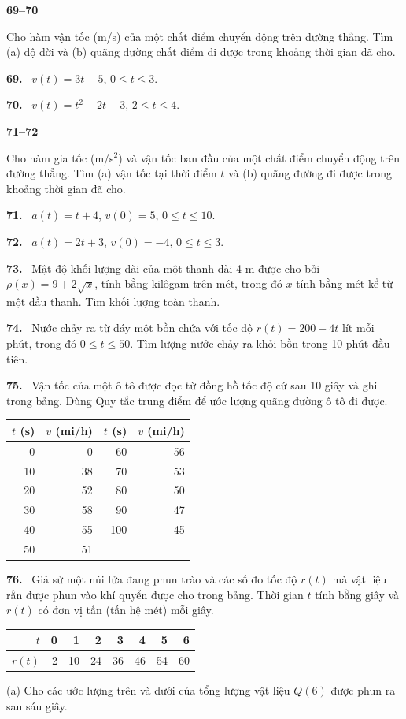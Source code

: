 \documentclass[12pt,a4paper]{article}
\newcommand{\bt}[1]{\par\smallskip\Needspace{5\baselineskip}\noindent\textbf{#1.}\ }
\newcommand{\group}[1]{\par\medskip\noindent\textbf{#1}\par\nopagebreak[4]}
\begin{document}
\group{69–70} Cho hàm vận tốc (m/s) của một chất điểm chuyển động trên đường thẳng. Tìm (a) độ dời và (b) quãng đường chất điểm đi được trong khoảng thời gian đã cho.
\bt{69} $v(t)=3t-5$, $0\le t\le3$.
\bt{70} $v(t)=t^2-2t-3$, $2\le t\le4$.

\group{71–72} Cho hàm gia tốc (m/s$^2$) và vận tốc ban đầu của một chất điểm chuyển động trên đường thẳng. Tìm (a) vận tốc tại thời điểm $t$ và (b) quãng đường đi được trong khoảng thời gian đã cho.
\bt{71} $a(t)=t+4$, $v(0)=5$, $0\le t\le10$.
\bt{72} $a(t)=2t+3$, $v(0)=-4$, $0\le t\le3$.

\bt{73} Mật độ khối lượng dài của một thanh dài 4 m được cho bởi $\rho(x)=9+2\sqrt x$, tính bằng kilôgam trên mét, trong đó $x$ tính bằng mét kể từ một đầu thanh. Tìm khối lượng toàn thanh.
\bt{74} Nước chảy ra từ đáy một bồn chứa với tốc độ $r(t)=200-4t$ lít mỗi phút, trong đó $0\le t\le50$. Tìm lượng nước chảy ra khỏi bồn trong 10 phút đầu tiên.
\bt{75} Vận tốc của một ô tô được đọc từ đồng hồ tốc độ cứ sau 10 giây và ghi trong bảng. Dùng Quy tắc trung điểm để ước lượng quãng đường ô tô đi được.
\begin{center}
\begin{tabular}{rrrr}\toprule
$t$ (s)&$v$ (mi/h)&$t$ (s)&$v$ (mi/h)\\\midrule
0&0&60&56\\10&38&70&53\\20&52&80&50\\30&58&90&47\\40&55&100&45\\50&51&&\\\bottomrule
\end{tabular}
\end{center}
\bt{76} Giả sử một núi lửa đang phun trào và các số đo tốc độ $r(t)$ mà vật liệu rắn được phun vào khí quyển được cho trong bảng. Thời gian $t$ tính bằng giây và $r(t)$ có đơn vị tấn (tấn hệ mét) mỗi giây.
\begin{center}\begin{tabular}{rrrrrrrr}\toprule
$t$&0&1&2&3&4&5&6\\\midrule
$r(t)$&2&10&24&36&46&54&60\\\bottomrule
\end{tabular}\end{center}
\noindent(a) Cho các ước lượng trên và dưới của tổng lượng vật liệu $Q(6)$ được phun ra sau sáu giây.\par
\end{document}
